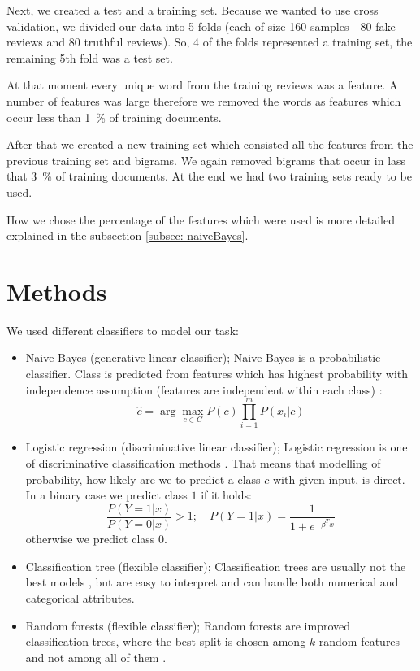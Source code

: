 \documentclass[a4paper,11pt]{article}
\begin{document}
Next, we created a test and a training set. Because we wanted to use cross validation, we divided our data into 5 folds (each of size 160 samples - 80 fake reviews and 80 truthful reviews). So, 4 of the folds represented a training set, the remaining 5th fold was a test set. 

At that moment every unique word from the training reviews was a feature.  A number of features was large therefore we removed the words as features which occur less than 1~\% of training documents.

After that we created a new training set which consisted all the features from the previous training set and bigrams. We again removed bigrams that occur in lass that  3~\% of training documents. At the end we had two training sets ready to be used. 

How we chose the percentage of the features which were used is more detailed explained in the subsection \ref{subsec: naiveBayes}.

\section{Methods}
\label{sec: methods}

We used different classifiers to model our task:
\begin{itemize}
	\item Naive Bayes (generative linear classifier); Naive Bayes is a probabilistic classifier. Class is predicted from features which has highest probability with independence assumption (features are independent within each class) \cite{naiveBayes}:
\[
\hat{c} = \arg\max_{c \in C} P(c) \prod_{i = 1}^m P(x_i | c)
\] 
	\item Logistic regression (discriminative linear classifier); Logistic regression is one of discriminative classification methods \cite{logisticRegression}. That means that modelling of probability, how likely are we to predict a class $c$ with given input, is direct. In a binary case we predict class $1$ if it holds:
\[
\frac{P(Y = 1 | x)}{P(Y = 0 | x)} > 1; \quad P (Y = 1 | x) = \frac{1}{1 + e^{-\beta^T x}}
\]
otherwise we predict class $0$.
	\item Classification tree (flexible classifier); Classification trees are usually not the best models \cite{classificationTrees}, but are easy to interpret and can handle both numerical and categorical attributes. 
	\item Random forests (flexible classifier); Random forests are improved classification trees, where the best split is chosen among $k$ random features and not among all of them \cite{randomForestsL}. 
\end{itemize}
\end{document}
